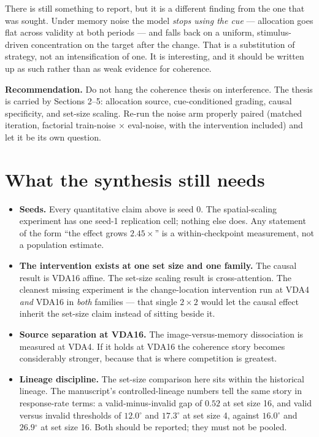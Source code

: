 \documentclass[11pt]{article}
\newcommand{\dg}{\ensuremath{^\circ}}
\newcommand{\claimbox}[1]{\par\smallskip\noindent\colorbox{box}{\parbox{0.97\linewidth}{\vspace{1mm}#1\vspace{1mm}}}\par\smallskip}
\begin{document}
There is still something to report, but it is a different finding from the one that was
sought. Under memory noise the model \emph{stops using the cue} --- allocation goes flat
across validity at both periods --- and falls back on a uniform, stimulus-driven
concentration on the target after the change. That is a substitution of strategy, not an
intensification of one. It is interesting, and it should be written up as such rather than
as weak evidence for coherence.

\claimbox{\textbf{Recommendation.} Do not hang the coherence thesis on interference. The
thesis is carried by Sections 2--5: allocation source, cue-conditioned grading, causal
specificity, and set-size scaling. Re-run the noise arm properly paired (matched iteration,
factorial train-noise $\times$ eval-noise, with the intervention included) and let it be its
own question.}

\section{What the synthesis still needs}

\begin{itemize}[leftmargin=1.4em,itemsep=2pt]
\item \textbf{Seeds.} Every quantitative claim above is seed 0. The spatial-scaling
experiment has one seed-1 replication cell; nothing else does. Any statement of the form
``the effect grows $2.45\times$'' is a within-checkpoint measurement, not a population estimate.
\item \textbf{The intervention exists at one set size and one family.} The causal result is
VDA16 affine. The set-size scaling result is cross-attention. The cleanest missing experiment
is the change-location intervention run at VDA4 \emph{and} VDA16 in \emph{both} families ---
that single $2\times2$ would let the causal effect inherit the set-size claim instead of
sitting beside it.
\item \textbf{Source separation at VDA16.} The image-versus-memory dissociation is measured
at VDA4. If it holds at VDA16 the coherence story becomes considerably stronger, because
that is where competition is greatest.
\item \textbf{Lineage discipline.} The set-size comparison here sits within the historical
lineage. The manuscript's controlled-lineage numbers tell the same story in response-rate
terms: a valid-minus-invalid gap of $0.52$ at set size 16, and valid versus invalid
thresholds of $12.0\dg$ and $17.3\dg$ at set size 4, against $16.0\dg$ and $26.9\dg$ at set
size 16. Both should be reported; they must not be pooled.
\end{itemize}
\end{document}
